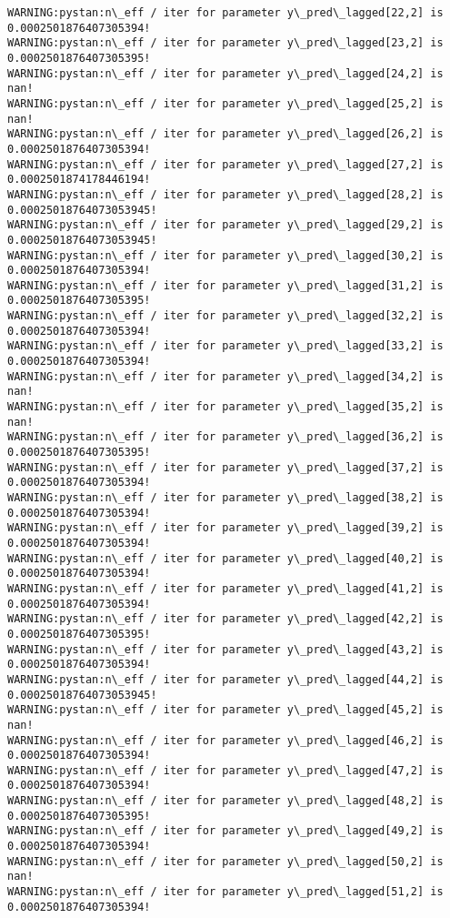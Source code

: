 \documentclass[11pt]{article}
\begin{document}
\begin{Verbatim}[commandchars=\\\{\}]
WARNING:pystan:n\_eff / iter for parameter y\_pred\_lagged[22,2] is 0.0002501876407305394!
WARNING:pystan:n\_eff / iter for parameter y\_pred\_lagged[23,2] is 0.0002501876407305395!
WARNING:pystan:n\_eff / iter for parameter y\_pred\_lagged[24,2] is nan!
WARNING:pystan:n\_eff / iter for parameter y\_pred\_lagged[25,2] is nan!
WARNING:pystan:n\_eff / iter for parameter y\_pred\_lagged[26,2] is 0.0002501876407305394!
WARNING:pystan:n\_eff / iter for parameter y\_pred\_lagged[27,2] is 0.0002501874178446194!
WARNING:pystan:n\_eff / iter for parameter y\_pred\_lagged[28,2] is 0.00025018764073053945!
WARNING:pystan:n\_eff / iter for parameter y\_pred\_lagged[29,2] is 0.00025018764073053945!
WARNING:pystan:n\_eff / iter for parameter y\_pred\_lagged[30,2] is 0.0002501876407305394!
WARNING:pystan:n\_eff / iter for parameter y\_pred\_lagged[31,2] is 0.0002501876407305395!
WARNING:pystan:n\_eff / iter for parameter y\_pred\_lagged[32,2] is 0.0002501876407305394!
WARNING:pystan:n\_eff / iter for parameter y\_pred\_lagged[33,2] is 0.0002501876407305394!
WARNING:pystan:n\_eff / iter for parameter y\_pred\_lagged[34,2] is nan!
WARNING:pystan:n\_eff / iter for parameter y\_pred\_lagged[35,2] is nan!
WARNING:pystan:n\_eff / iter for parameter y\_pred\_lagged[36,2] is 0.0002501876407305395!
WARNING:pystan:n\_eff / iter for parameter y\_pred\_lagged[37,2] is 0.0002501876407305394!
WARNING:pystan:n\_eff / iter for parameter y\_pred\_lagged[38,2] is 0.0002501876407305394!
WARNING:pystan:n\_eff / iter for parameter y\_pred\_lagged[39,2] is 0.0002501876407305394!
WARNING:pystan:n\_eff / iter for parameter y\_pred\_lagged[40,2] is 0.0002501876407305394!
WARNING:pystan:n\_eff / iter for parameter y\_pred\_lagged[41,2] is 0.0002501876407305394!
WARNING:pystan:n\_eff / iter for parameter y\_pred\_lagged[42,2] is 0.0002501876407305395!
WARNING:pystan:n\_eff / iter for parameter y\_pred\_lagged[43,2] is 0.0002501876407305394!
WARNING:pystan:n\_eff / iter for parameter y\_pred\_lagged[44,2] is 0.00025018764073053945!
WARNING:pystan:n\_eff / iter for parameter y\_pred\_lagged[45,2] is nan!
WARNING:pystan:n\_eff / iter for parameter y\_pred\_lagged[46,2] is 0.0002501876407305394!
WARNING:pystan:n\_eff / iter for parameter y\_pred\_lagged[47,2] is 0.0002501876407305394!
WARNING:pystan:n\_eff / iter for parameter y\_pred\_lagged[48,2] is 0.0002501876407305395!
WARNING:pystan:n\_eff / iter for parameter y\_pred\_lagged[49,2] is 0.0002501876407305394!
WARNING:pystan:n\_eff / iter for parameter y\_pred\_lagged[50,2] is nan!
WARNING:pystan:n\_eff / iter for parameter y\_pred\_lagged[51,2] is 0.0002501876407305394!

\end{Verbatim}
\end{document}

